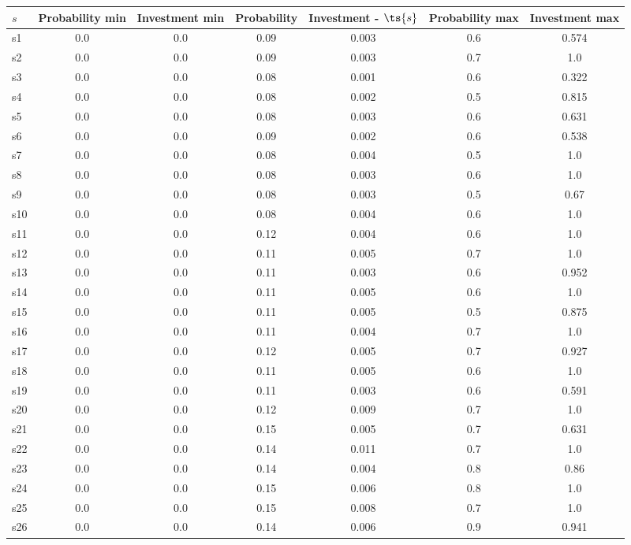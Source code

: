 \documentclass{article}
\begin{document}
\noindent\begin{tabular}{|l|c|c|c|c|c|c|}
\hline
$s$& Probability min & Investment min & Probability & Investment - $\ts{s}$ & Probability max & Investment max\\
\hline
s1 &0.0 & 0.0 & 0.09 & 0.003 & 0.6 & 0.574\\
\hline
s2 &0.0 & 0.0 & 0.09 & 0.003 & 0.7 & 1.0\\
\hline
s3 &0.0 & 0.0 & 0.08 & 0.001 & 0.6 & 0.322\\
\hline
s4 &0.0 & 0.0 & 0.08 & 0.002 & 0.5 & 0.815\\
\hline
s5 &0.0 & 0.0 & 0.08 & 0.003 & 0.6 & 0.631\\
\hline
s6 &0.0 & 0.0 & 0.09 & 0.002 & 0.6 & 0.538\\
\hline
s7 &0.0 & 0.0 & 0.08 & 0.004 & 0.5 & 1.0\\
\hline
s8 &0.0 & 0.0 & 0.08 & 0.003 & 0.6 & 1.0\\
\hline
s9 &0.0 & 0.0 & 0.08 & 0.003 & 0.5 & 0.67\\
\hline
s10 &0.0 & 0.0 & 0.08 & 0.004 & 0.6 & 1.0\\
\hline
s11 &0.0 & 0.0 & 0.12 & 0.004 & 0.6 & 1.0\\
\hline
s12 &0.0 & 0.0 & 0.11 & 0.005 & 0.7 & 1.0\\
\hline
s13 &0.0 & 0.0 & 0.11 & 0.003 & 0.6 & 0.952\\
\hline
s14 &0.0 & 0.0 & 0.11 & 0.005 & 0.6 & 1.0\\
\hline
s15 &0.0 & 0.0 & 0.11 & 0.005 & 0.5 & 0.875\\
\hline
s16 &0.0 & 0.0 & 0.11 & 0.004 & 0.7 & 1.0\\
\hline
s17 &0.0 & 0.0 & 0.12 & 0.005 & 0.7 & 0.927\\
\hline
s18 &0.0 & 0.0 & 0.11 & 0.005 & 0.6 & 1.0\\
\hline
s19 &0.0 & 0.0 & 0.11 & 0.003 & 0.6 & 0.591\\
\hline
s20 &0.0 & 0.0 & 0.12 & 0.009 & 0.7 & 1.0\\
\hline
s21 &0.0 & 0.0 & 0.15 & 0.005 & 0.7 & 0.631\\
\hline
s22 &0.0 & 0.0 & 0.14 & 0.011 & 0.7 & 1.0\\
\hline
s23 &0.0 & 0.0 & 0.14 & 0.004 & 0.8 & 0.86\\
\hline
s24 &0.0 & 0.0 & 0.15 & 0.006 & 0.8 & 1.0\\
\hline
s25 &0.0 & 0.0 & 0.15 & 0.008 & 0.7 & 1.0\\
\hline
s26 &0.0 & 0.0 & 0.14 & 0.006 & 0.9 & 0.941\\

\end{tabular}
\end{document}
